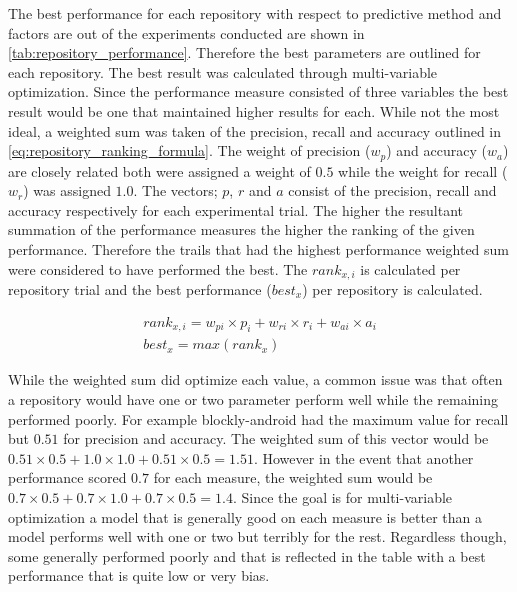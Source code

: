 The best performance for each repository with respect to predictive method and factors are out of the experiments conducted are shown in \autoref{tab:repository_performance}. Therefore the best parameters are outlined for each repository. The best result was calculated through multi-variable optimization. Since the performance measure consisted of three variables the best result would be one that maintained higher results for each. While not the most ideal, a weighted sum was taken of the precision, recall and accuracy outlined in \autoref{eq:repository_ranking_formula}. The weight of precision ($w_{p}$) and accuracy ($w_{a}$) are closely related both were assigned a weight of $0.5$ while the weight for recall ($w_{r}$) was assigned $1.0$. The vectors; $p$, $r$ and $a$ consist of the precision, recall and accuracy respectively for each experimental trial. The higher the resultant summation of the performance measures the higher the ranking of the given performance. Therefore the trails that had the highest performance weighted sum were considered to have performed the best. The $rank_{x,i}$ is calculated per repository trial and the best performance ($best_{x}$) per repository is calculated.

\begin{equation} 
\label{eq:repository_ranking_formula}
\begin{matrix}
rank_{x,i} = w_{pi} \times p_i + w_{ri} \times r_i + w_{ai} \times a_i \\
best_{x} = max(rank_{x})
\end{matrix}
\end{equation}

While the weighted sum did optimize each value, a common issue was that often a repository would have one or two parameter perform well while the remaining performed poorly. For example blockly-android had the maximum value for recall but $0.51$ for precision and accuracy. The weighted sum of this vector would be $0.51 \times 0.5 + 1.0 \times 1.0 + 0.51 \times 0.5 = 1.51$. However in the event that another performance scored $0.7$ for each measure, the weighted sum would be $0.7 \times 0.5 + 0.7 \times 1.0 + 0.7 \times 0.5 = 1.4$. Since the goal is for multi-variable optimization a model that is generally good on each measure is better than a model performs well with one or two but terribly for the rest. Regardless though, some generally performed poorly and that is reflected in the table with a best performance that is quite low or very bias. 

